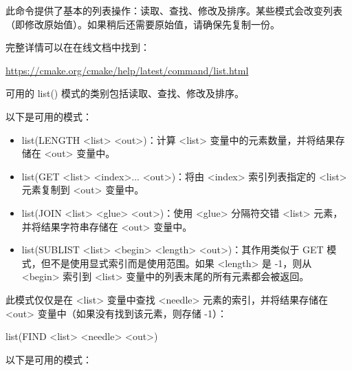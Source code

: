 

此命令提供了基本的列表操作：读取、查找、修改及排序。某些模式会改变列表（即修改原始值）。如果稍后还需要原始值，请确保先复制一份。

完整详情可以在在线文档中找到：

\url{https://cmake.org/cmake/help/latest/command/list.html}

可用的 list() 模式的类别包括读取、查找、修改及排序。


以下是可用的模式：

\begin{itemize}
\item
list(LENGTH <list> <out>)：计算 <list> 变量中的元素数量，并将结果存储在 <out> 变量中。

\item
list(GET <list> <index>... <out>)：将由 <index> 索引列表指定的 <list> 元素复制到 <out> 变量中。

\item
list(JOIN <list> <glue> <out>)：使用 <glue> 分隔符交错 <list> 元素，并将结果字符串存储在 <out> 变量中。

\item
list(SUBLIST <list> <begin> <length> <out>)：其作用类似于 GET 模式，但不是使用显式索引而是使用范围。如果 <length> 是 -1，则从 <begin> 索引到 <list> 变量中的列表末尾的所有元素都会被返回。
\end{itemize}


此模式仅仅是在 <list> 变量中查找 <needle> 元素的索引，并将结果存储在 <out> 变量中（如果没有找到该元素，则存储 -1）：

\begin{cmake}
list(FIND <list> <needle> <out>)
\end{cmake}


以下是可用的模式：

